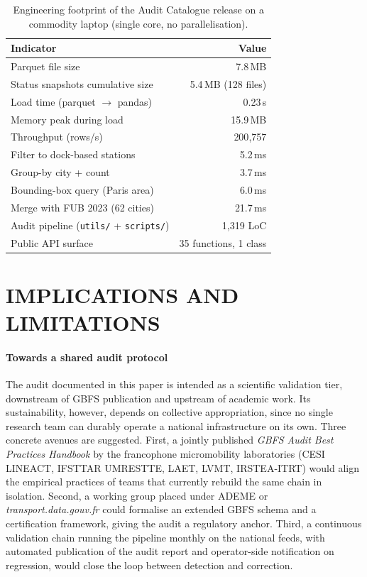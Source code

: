\documentclass[a4paper,twoside]{article}
\begin{document}
\begin{table}[ht]
\centering
\caption{Engineering footprint of the Audit Catalogue release
on a commodity laptop (single core, no parallelisation).}
\label{tab:engineering-footprint}
\small
\begin{tabular}{@{}lr@{}}
\toprule
\textbf{Indicator} & \textbf{Value}\\
\midrule
Parquet file size                           & 7.8\,MB\\
Status snapshots cumulative size            & 5.4\,MB (128 files)\\
Load time (parquet $\to$ pandas)            & 0.23\,s\\
Memory peak during load                     & 15.9\,MB\\
Throughput (rows/s)                         & 200{,}757\\
Filter to dock-based stations               & 5.2\,ms\\
Group-by city + count                       & 3.7\,ms\\
Bounding-box query (Paris area)             & 6.0\,ms\\
Merge with FUB 2023 (62 cities)             & 21.7\,ms\\
Audit pipeline (\texttt{utils/} +
                \texttt{scripts/})          & 1{,}319 LoC\\
Public API surface                          & 35 functions, 1 class\\
\bottomrule
\end{tabular}
\end{table}

\section{\uppercase{Implications and Limitations}}
\label{secCommunity}

\paragraph{Towards a shared audit protocol}
The audit documented in this paper is intended as a scientific
validation tier, downstream of GBFS publication and upstream of
academic work. Its sustainability, however, depends on collective
appropriation, since no single research team can durably operate
a national infrastructure on its own. Three concrete avenues are
suggested. First, a jointly published \emph{GBFS Audit Best
Practices Handbook} by the francophone micromobility laboratories
(CESI LINEACT, IFSTTAR UMRESTTE, LAET, LVMT, IRSTEA-ITRT) would
align the empirical practices of teams that currently rebuild the
same chain in isolation. Second, a working group placed under
ADEME or \emph{transport.data.gouv.fr} could formalise an
extended GBFS schema and a certification framework, giving the
audit a regulatory anchor. Third, a continuous validation chain
running the pipeline monthly on the national feeds, with
automated publication of the audit report and operator-side
notification on regression, would close the loop between
detection and correction.
\end{document}
